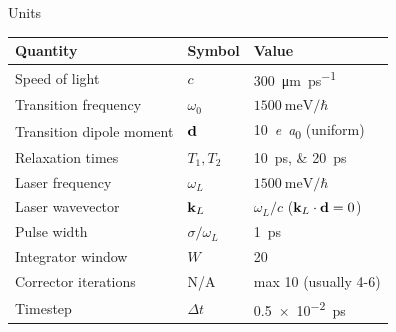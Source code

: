 \documentclass[aspectratio=169, usenames, dvipsnames]{beamer}
\begin{document}
\begin{frame}{Units}
  \begin{table}
    \begin{tabular}{lll}
      Quantity                 & Symbol            & Value                        \\ \hline \hline
      Speed of light           & $c$               & \SI{300}{\micro\meter \per \pico\second} \\
      Transition frequency     & $\omega_0$        & $\SI{1500}{\milli\eV}/\hbar$ \\
      Transition dipole moment & $\vb{d}$          & \SI{10}{\elementarycharge\bohr} (uniform) \\
      Relaxation times         & $T_{1}, T_{2}$    & \SIlist{10;20}{\pico\second} \\
      Laser frequency          & $\omega_L$        & $\SI{1500}{\milli\eV}/\hbar$ \\
      Laser wavevector         & $\vb{k}_L$        & $\omega_L/c$ ($\vb{k}_L \cdot \vb{d} = 0$) \\
      Pulse width              & $\sigma/\omega_L$ & \SI{1}{\pico\second} \\ \hline
      Integrator window        & $W$               & 20 \\
      Corrector iterations     & N/A               & max 10 (usually 4-6) \\
      Timestep                 & $\Delta t$        & \SI{0.5e-2}{\pico\second}
    \end{tabular}
  \end{table}
\end{frame}
\end{document}
